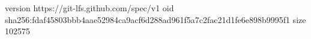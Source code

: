 version https://git-lfs.github.com/spec/v1
oid sha256:fdaf45803bbb4aae52984ca9acf6d288ad961f5a7c2fac21d1fe6e898b9995f1
size 102575
